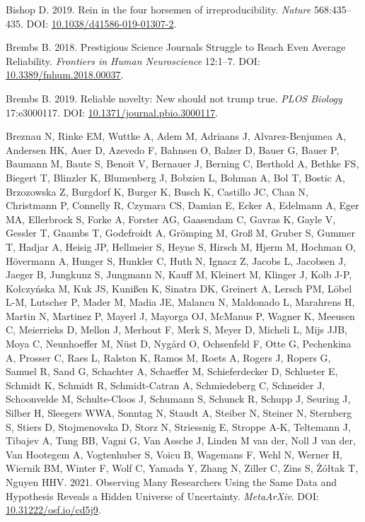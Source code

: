 \documentclass[10pt,a4paper]{article}
\newlength{\cslhangindent}
\newlength{\cslentryspacingunit} %
\newenvironment{CSLReferences}[2] %
 {%
  \setlength{\parindent}{0pt}
  \ifodd #1
  \let\oldpar\par
  \def\par{\hangindent=\cslhangindent\oldpar}
  \fi
  \setlength{\parskip}{#2\cslentryspacingunit}
 }%
 {}
\begin{document}
\begin{CSLReferences}{1}{0}
\leavevmode{}%
Bishop D. 2019. Rein in the four horsemen of irreproducibility. \emph{Nature} 568:435--435. DOI: \href{https://doi.org/10.1038/d41586-019-01307-2}{10.1038/d41586-019-01307-2}.

\leavevmode{}%
Brembs B. 2018. Prestigious {Science} {Journals} {Struggle} to {Reach} {Even} {Average} {Reliability}. \emph{Frontiers in Human Neuroscience} 12:1--7. DOI: \href{https://doi.org/10.3389/fnhum.2018.00037}{10.3389/fnhum.2018.00037}.

\leavevmode{}%
Brembs B. 2019. Reliable novelty: {New} should not trump true. \emph{PLOS Biology} 17:e3000117. DOI: \href{https://doi.org/10.1371/journal.pbio.3000117}{10.1371/journal.pbio.3000117}.

\leavevmode{}%
Breznau N, Rinke EM, Wuttke A, Adem M, Adriaans J, Alvarez-Benjumea A, Andersen HK, Auer D, Azevedo F, Bahnsen O, Balzer D, Bauer G, Bauer P, Baumann M, Baute S, Benoit V, Bernauer J, Berning C, Berthold A, Bethke FS, Biegert T, Blinzler K, Blumenberg J, Bobzien L, Bohman A, Bol T, Bostic A, Brzozowska Z, Burgdorf K, Burger K, Busch K, Castillo JC, Chan N, Christmann P, Connelly R, Czymara CS, Damian E, Ecker A, Edelmann A, Eger MA, Ellerbrock S, Forke A, Forster AG, Gaasendam C, Gavras K, Gayle V, Gessler T, Gnambs T, Godefroidt A, Grömping M, Groß M, Gruber S, Gummer T, Hadjar A, Heisig JP, Hellmeier S, Heyne S, Hirsch M, Hjerm M, Hochman O, Hövermann A, Hunger S, Hunkler C, Huth N, Ignacz Z, Jacobs L, Jacobsen J, Jaeger B, Jungkunz S, Jungmann N, Kauff M, Kleinert M, Klinger J, Kolb J-P, Kołczyńska M, Kuk JS, Kunißen K, Sinatra DK, Greinert A, Lersch PM, Löbel L-M, Lutscher P, Mader M, Madia JE, Malancu N, Maldonado L, Marahrens H, Martin N, Martinez P, Mayerl J, Mayorga OJ, McManus P, Wagner K, Meeusen C, Meierrieks D, Mellon J, Merhout F, Merk S, Meyer D, Micheli L, Mijs JJB, Moya C, Neunhoeffer M, Nüst D, Nygård O, Ochsenfeld F, Otte G, Pechenkina A, Prosser C, Raes L, Ralston K, Ramos M, Roets A, Rogers J, Ropers G, Samuel R, Sand G, Schachter A, Schaeffer M, Schieferdecker D, Schlueter E, Schmidt K, Schmidt R, Schmidt-Catran A, Schmiedeberg C, Schneider J, Schoonvelde M, Schulte-Cloos J, Schumann S, Schunck R, Schupp J, Seuring J, Silber H, Sleegers WWA, Sonntag N, Staudt A, Steiber N, Steiner N, Sternberg S, Stiers D, Stojmenovska D, Storz N, Striessnig E, Stroppe A-K, Teltemann J, Tibajev A, Tung BB, Vagni G, Van Assche J, Linden M van der, Noll J van der, Van Hootegem A, Vogtenhuber S, Voicu B, Wagemans F, Wehl N, Werner H, Wiernik BM, Winter F, Wolf C, Yamada Y, Zhang N, Ziller C, Zins S, Żółtak T, Nguyen HHV. 2021. Observing {Many} {Researchers} {Using} the {Same} {Data} and {Hypothesis} {Reveals} a {Hidden} {Universe} of {Uncertainty}. \emph{MetaArXiv}. DOI: \href{https://doi.org/10.31222/osf.io/cd5j9}{10.31222/osf.io/cd5j9}.


\end{CSLReferences}
\end{document}
